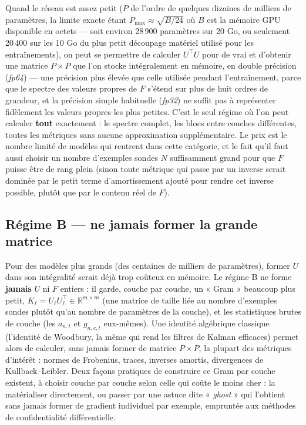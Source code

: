 \documentclass[11pt,a4paper]{article}
\newcommand{\eng}[1]{\emph{#1}}
\begin{document}
Quand le réseau est assez petit ($P$ de l'ordre de quelques dizaines de milliers de paramètres, la
limite exacte étant $P_{\max}\approx\sqrt{B/24}$ où $B$ est la mémoire GPU disponible en octets —
soit environ 28\,900 paramètres sur 20 Go, ou seulement 20\,400 sur les 10 Go du plus petit
découpage matériel utilisé pour les entraînements), on peut se permettre de calculer $U^\top U$ pour
de vrai et d'obtenir une matrice $P\times P$ que l'on stocke intégralement en mémoire, en double
précision (\eng{fp64}) — une précision plus élevée que celle utilisée pendant l'entraînement, parce
que le spectre des valeurs propres de $F$ s'étend sur plus de huit ordres de grandeur, et la
précision simple habituelle (\eng{fp32}) ne suffit pas à représenter fidèlement les valeurs propres
les plus petites. C'est le seul régime où l'on peut calculer \textbf{tout} exactement : le spectre
complet, les blocs entre couches différentes, toutes les métriques sans aucune approximation
supplémentaire. Le prix est le nombre limité de modèles qui rentrent dans cette catégorie, et le fait
qu'il faut aussi choisir un nombre d'exemples sondes $N$ suffisamment grand pour que $F$ puisse être
de rang plein (sinon toute métrique qui passe par un inverse serait dominée par le petit terme
d'amortissement ajouté pour rendre cet inverse possible, plutôt que par le contenu réel de $F$).

\subsection{Régime B — ne jamais former la grande matrice}

Pour des modèles plus grands (des centaines de milliers de paramètres), former $U$ dans son
intégralité serait déjà trop coûteux en mémoire. Le régime B ne forme \textbf{jamais} $U$ ni $F$
entiers : il garde, couche par couche, un « Gram » beaucoup plus petit,
$K_\ell = U_\ell U_\ell^\top \in\mathbb R^{m\times m}$ (une matrice de taille liée au nombre
d'exemples sondes plutôt qu'au nombre de paramètres de la couche), et les statistiques brutes de
couche (les $a_{n,t}$ et $g_{n,c,t}$ eux-mêmes). Une identité algébrique classique (l'identité de
Woodbury, la même qui rend les filtres de Kalman efficaces) permet alors de calculer, sans jamais
former de matrice $P\times P$, la plupart des métriques d'intérêt : normes de Frobenius, traces,
inverses amortis, divergences de Kullback--Leibler. Deux façons pratiques de construire ce Gram par
couche existent, à choisir couche par couche selon celle qui coûte le moins cher : la matérialiser
directement, ou passer par une astuce dite « \eng{ghost} » qui l'obtient sans jamais former de
gradient individuel par exemple, empruntée aux méthodes de confidentialité différentielle.
\end{document}
